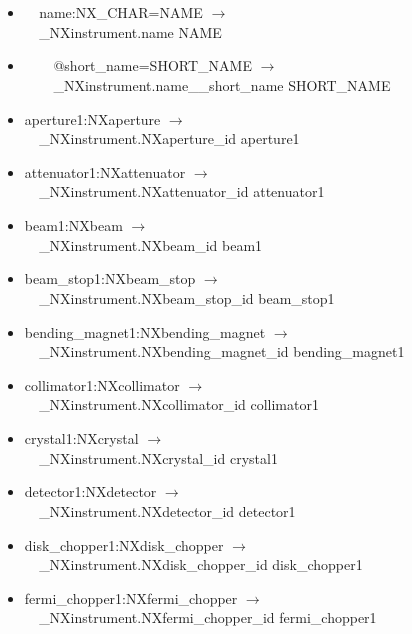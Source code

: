 \documentclass[11pt]{article}
\begin{document}
{{\begin{itemize}
\item{\verb|  |name:NX\_CHAR=NAME $\rightarrow$\\
\verb|  |\_NXinstrument.name NAME}

\item{\verb|    |@short\_name=SHORT\_NAME $\rightarrow$\\
\verb|    |\_NXinstrument.name\_\_short\_name SHORT\_NAME}

\item{aperture1:NXaperture $\rightarrow$\\
\verb|  |\_NXinstrument.NXaperture\_id aperture1}

\item{attenuator1:NXattenuator $\rightarrow$\\
\verb|  |\_NXinstrument.NXattenuator\_id attenuator1}

\item{beam1:NXbeam $\rightarrow$\\
\verb|  |\_NXinstrument.NXbeam\_id beam1}

\item{beam\_stop1:NXbeam\_stop $\rightarrow$\\
\verb|  |\_NXinstrument.NXbeam\_stop\_id beam\_stop1}

\item{bending\_magnet1:NXbending\_magnet $\rightarrow$\\
\verb|  |\_NXinstrument.NXbending\_magnet\_id bending\_magnet1}

\item{collimator1:NXcollimator $\rightarrow$\\
\verb|  |\_NXinstrument.NXcollimator\_id collimator1}

\item{crystal1:NXcrystal $\rightarrow$\\
\verb|  |\_NXinstrument.NXcrystal\_id crystal1}

\item{detector1:NXdetector $\rightarrow$\\
\verb|  |\_NXinstrument.NXdetector\_id detector1}

\item{disk\_chopper1:NXdisk\_chopper $\rightarrow$\\
\verb|  |\_NXinstrument.NXdisk\_chopper\_id disk\_chopper1}

\item{fermi\_chopper1:NXfermi\_chopper $\rightarrow$\\
\verb|  |\_NXinstrument.NXfermi\_chopper\_id fermi\_chopper1}


\end{itemize}}}
\end{document}
